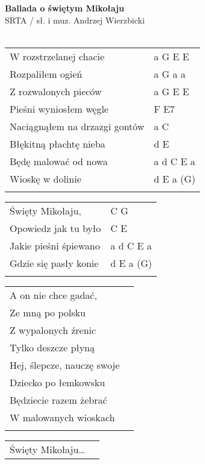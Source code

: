 \documentclass[a5paper]{article}
\begin{document}


\noindent
\fontsize{12pt}{15pt}\selectfont
\textbf{Ballada o świętym Mikołaju} \\
\fontsize{8pt}{10pt}\selectfont
SRTA / sł. i muz. Andrzej Wierzbicki \\ \\
\fontsize{10pt}{12pt}\selectfont
{}
\begin{tabular}{@{}p{8cm}p{3cm}@{}}
\noindent
W rozstrzelanej chacie & a G E E \\
Rozpaliłem ogień & a G a a \\
Z rozwalonych pieców & a G E E \\
Pieśni wyniosłem węgle & F E7 \\
Naciągnąłem na drzazgi gontów & a C \\
Błękitną płachtę nieba & d E \\
Będę malować od nowa & a d C E a \\
Wioskę w dolinie & d E a (G) \\ \\
\end{tabular}

\noindent
\begin{tabular}{@{}p{7cm}p{3cm}@{}}
Święty Mikołaju, & C G \\
Opowiedz jak tu było & C E \\
Jakie pieśni śpiewano & a d C E a \\
Gdzie się pasły konie & d E a (G) \\ \\
\end{tabular}

\noindent
\begin{tabular}{@{}p{8.5cm}p{3cm}@{}}
A on nie chce gadać, \\
Ze mną po polsku \\
Z wypalonych źrenic \\
Tylko deszcze płyną \\
Hej, ślepcze, nauczę swoje \\
Dziecko po łemkowsku \\
Będziecie razem żebrać \\
W malowanych wioskach \\ \\
\end{tabular}

\noindent
\begin{tabular}{@{}p{8.5cm}p{3cm}@{}} 
Święty Mikołaju… \\
\end{tabular}
\end{document}

